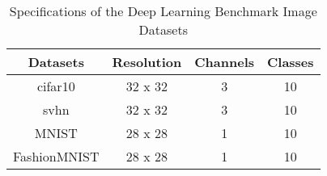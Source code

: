 \begin{table}[ht]
\small
\centering
\begin{threeparttable}
\renewcommand{\arraystretch}{1.3}
\caption{Specifications of the Deep Learning Benchmark Image Datasets}
\label{tab:deep-datasets}
\centering
\begin{tabular}{c|ccc}
\hline
\bfseries  Datasets & \bfseries Resolution & \bfseries Channels & \bfseries Classes\\
\hline
\gls{cifar10} & 32 x 32 & 3 & 10 \\
\gls{svhn} & 32 x 32 & 3 & 10 \\
MNIST & 28 x 28 & 1 & 10 \\
FashionMNIST & 28 x 28 & 1 & 10 \\
\hline
\end{tabular}
\end{threeparttable}
\end{table}
